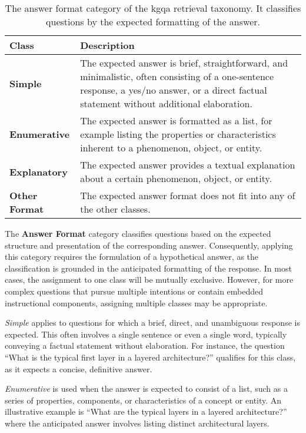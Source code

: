 \begin{table}[t]
    \centering
    \begin{tabular}{@{}lp{8cm}@{}}
        \toprule
        \textbf{Class} & \textbf{Description} \\
        \midrule
        \textbf{Simple}
            & The expected answer is brief, straightforward, and minimalistic, often consisting of a one-sentence response, a yes/no answer, or a direct factual statement without additional elaboration. \\
        \cmidrule(l){1-2}
            \textbf{Enumerative}
            & The expected answer is formatted as a list, for example listing the properties or characteristics inherent to a phenomenon, object, or entity. \\
        \cmidrule(l){1-2}
            \textbf{Explanatory}
            & The expected answer provides a textual explanation about a certain phenomenon, object, or entity. \\
        \cmidrule(l){1-2}
            \textbf{Other Format}
            & The expected answer format does not fit into any of the other classes. \\
        \bottomrule
    \end{tabular}
    \caption[Answer Format Category of the Taxonomy]{The answer format category of the \gls{kgqa} retrieval taxonomy. It classifies questions by the expected formatting of the answer.}
    \label{tab:answer_format}
\end{table}

The \textbf{Answer Format} category classifies questions based on the expected structure and presentation of the corresponding answer. Consequently, applying this category requires the formulation of a hypothetical answer, as the classification is grounded in the anticipated formatting of the response. In most cases, the assignment to one class will be mutually exclusive. However, for more complex questions that pursue multiple intentions or contain embedded instructional components, assigning multiple classes may be appropriate.

\emph{Simple} applies to questions for which a brief, direct, and unambiguous response is expected. This often involves a single sentence or even a single word, typically conveying a factual statement without elaboration. For instance, the question \enquote{What is the typical first layer in a layered architecture?} qualifies for this class, as it expects a concise, definitive answer.

\emph{Enumerative} is used when the answer is expected to consist of a list, such as a series of properties, components, or characteristics of a concept or entity. An illustrative example is \enquote{What are the typical layers in a layered architecture?} where the anticipated answer involves listing distinct architectural layers.

